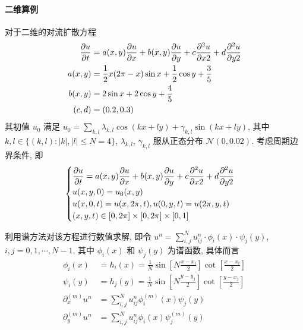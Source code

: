 \paragraph{二维算例}
对于二维的对流扩散方程
\[ \begin{aligned}
{\dfrac{\partial {u}}{\partial {t}}} &= a(x, y) {\dfrac{\partial {u}}{\partial {x}}} + b(x, y) {\dfrac{\partial {u}}{\partial {y}}}
    + c {\dfrac{\partial {^2u}}{\partial {x2}}} + d {\dfrac{\partial {^2u}}{\partial {y2}}} \\
a(x, y) &= \frac{1}{2}x(2\pi - x)\sin x + \frac{1}{2}\cos y + \frac{3}{5} \\
b(x, y) &= 2\sin x + 2\cos y + \frac{4}{5} \\
(c, d) &= (0.2, 0.3)
\end{aligned} \]
其初值 $u_0$ 满足
$u_0 = \sum_{k, l} \lambda_{k, l}\cos(kx+ly) + \gamma_{k, l}\sin(kx+ly)$, 其中
$k, l\in\{(k, l)\colon|k|, |l| \leq N = 4\}$, $\lambda_{k, l}$, $\gamma_{k, l}$
服从正态分布 $\mathcal N(0, 0.02)$. 考虑周期边界条件, 即
\[ \begin{cases}
{\dfrac{\partial {u}}{\partial {t}}} = a(x, y) {\dfrac{\partial {u}}{\partial {x}}} + b(x, y) {\dfrac{\partial {u}}{\partial {y}}}
    + c {\dfrac{\partial {^2u}}{\partial {x2}}} + d {\dfrac{\partial {^2u}}{\partial {y2}}} \\
u(x, y, 0) = u_0(x, y) \\
u(x, 0, t) = u(x, 2\pi, t),u(0, y, t) = u(2\pi, y, t) \\
(x, y, t) \in [0, 2\pi] \times [0, 2\pi] \times [0, 1]
\end{cases} \]

利用谱方法对该方程进行数值求解, 即令
$u^n = \sum_{i, j}^N u_{ij}^n \cdot \phi_i(x) \cdot \psi_j(y)$,
$i, j = 0, 1, \cdots, N - 1$, 其中 $\phi_i(x)$ 和 $\psi_j(y)$ 为谱函数, 具体而言
\[ \begin{aligned}
\phi_i(x) &= h_i(x) = \frac{1}{N} \sin \left[N\frac{x - x_i}{2}\right]
    \cot \left[\frac{x - x_i}{2}\right] \\
\psi_i(y) &= h_j(y) = \frac{1}{N} \sin \left[N\frac{y - y_j}{2}\right]
    \cot \left[\frac{y - x_j}{2}\right] \\
\partial_x^{(m)} u^n &= \sum_{i, j}^N u_{ij}^n \phi_i^{(m)}(x) \psi_j(y) \\
\partial_y^{(m)} u^n &= \sum_{i, j}^N u_{ij}^n \phi_i(x) \psi_j^{(m)}(y)
\end{aligned} \]

